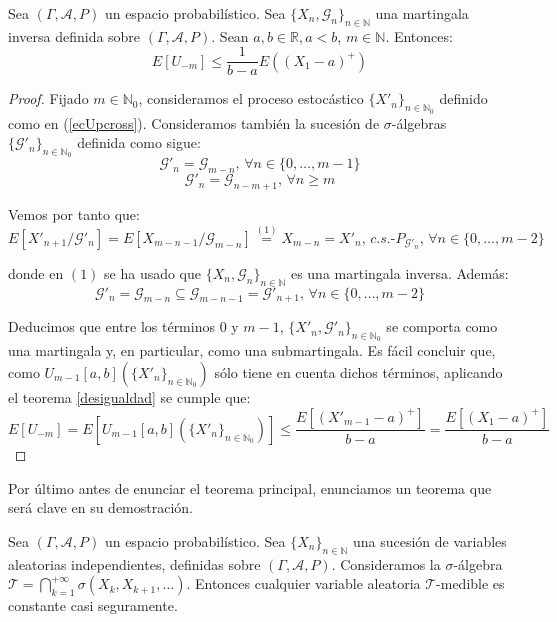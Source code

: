 \begin{teorema}\label{desigualdadInv}
Sea $(\Gamma , \mathcal{A}, P)$ un espacio probabilístico. Sea $\{X_n, \mathscr{G}_n\}_{n\in\mathds{N}}$ una martingala inversa definida sobre $(\Gamma , \mathcal{A}, P)$. Sean $a,b\in\mathds{R}, a<b$, $m\in\mathds{N}$. Entonces:
$$E[U_{-m}]\leq \frac{1}{b-a} E((X_1-a)^+)$$
\end{teorema}

\begin{proof}
Fijado $m\in \mathds{N}_0$, consideramos el proceso estocástico $\{X'_n\}_{n\in\mathds{N}_0}$ definido como en (\ref{ecUpcross}). Consideramos también la sucesión de  $\sigma$-álgebras $\{\mathscr{G}'_n\}_{n\in\mathds{N}_0}$ definida como sigue:
$$\mathscr{G}'_n = \mathscr{G}_{m-n} \text{, }\forall n\in \{0,\ldots , m-1\}$$
$$\mathscr{G}'_n = \mathscr{G}_{n-m+1} \text{, }\forall n\geq m$$ 

Vemos por tanto que:
$$E[X'_{n+1}/\mathscr{G}'_n] = E[X_{m-n-1}/\mathscr{G}_{m-n}] \overset{(1)}{=} X_{m-n} = X'_{n} \text{, }c.s.\text{-}P_{\mathscr{G}'_n}\text{, }\forall n\in\{0,\ldots , m-2\}$$

donde en $(1)$ se ha usado que $\{X_n, \mathscr{G}_n\}_{n\in\mathds{N}}$ es una martingala inversa. Además:
$$\mathscr{G}'_{n} = \mathscr{G}_{m-n} \subseteq \mathscr{G}_{m-n-1} = \mathscr{G}'_{n+1}\text{, }\forall n\in\{0,\ldots , m-2\}$$

Deducimos que entre los términos $0$ y $m-1$, $\{X'_n, \mathscr{G}'_n\}_{n\in\mathds{N}_0}$ se comporta como una martingala y, en particular, como una submartingala. Es fácil concluir que, como $U_{m-1}[a,b](\{X'_n\}_{n\in\mathds{N}_0})$ sólo tiene en cuenta dichos términos, aplicando el teorema \ref{desigualdad} se cumple que:
$$E[U_{-m}] = E[U_{m-1}[a,b](\{X'_n\}_{n\in\mathds{N}_0})] \leq \frac{E[(X'_{m-1}-a)^+]}{b-a} = \frac{E[(X_{1}-a)^+]}{b-a}$$

\end{proof}

Por último antes de enunciar el teorema principal, enunciamos un teorema que será clave en su demostración.
\begin{teorema}\label{Kolmog}
Sea $(\Gamma, \mathcal{A}, P)$ un espacio probabilístico. Sea $\{X_n\}_{n\in \mathds{N}}$ una sucesión de variables aleatorias independientes, definidas sobre $(\Gamma, \mathcal{A}, P)$. Consideramos la $\sigma$-álgebra $\mathscr{T} = \bigcap_{k=1}^{+\infty}\sigma(X_k,X_{k+1},\ldots)$. Entonces cualquier variable aleatoria $\mathscr{T}$-medible es constante casi seguramente.
\end{teorema}

